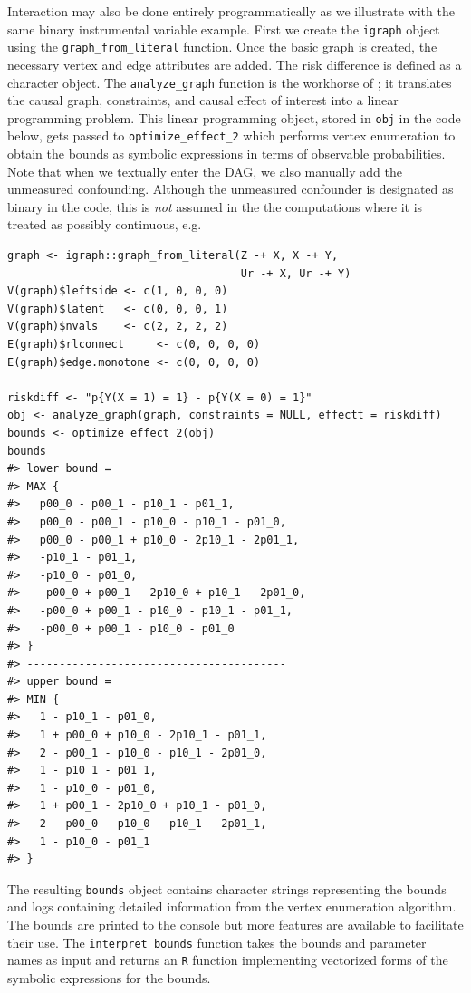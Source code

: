 Interaction may also be done entirely programmatically as we illustrate with the same binary instrumental variable example. First we create the \texttt{igraph} object using the \texttt{graph\_from\_literal} function. Once the basic graph is created, the necessary vertex and edge attributes are added. The risk difference is defined as a character object. The \texttt{analyze\_graph} function is the workhorse of ; it translates the causal graph, constraints, and causal effect of interest into a linear programming problem. This linear programming object, stored in \texttt{obj} in the code below, gets passed to \texttt{optimize\_effect\_2} which performs vertex enumeration to obtain the bounds as symbolic expressions in terms of observable probabilities. Note that when we textually enter the DAG, we also manually add the unmeasured confounding. Although the unmeasured confounder is designated as binary in the code, this is \emph{not} assumed in the the computations where it is treated as possibly continuous, e.g.

\begin{verbatim}
graph <- igraph::graph_from_literal(Z -+ X, X -+ Y, 
                                    Ur -+ X, Ur -+ Y)
V(graph)$leftside <- c(1, 0, 0, 0)
V(graph)$latent   <- c(0, 0, 0, 1)
V(graph)$nvals    <- c(2, 2, 2, 2)
E(graph)$rlconnect     <- c(0, 0, 0, 0)
E(graph)$edge.monotone <- c(0, 0, 0, 0)

riskdiff <- "p{Y(X = 1) = 1} - p{Y(X = 0) = 1}"
obj <- analyze_graph(graph, constraints = NULL, effectt = riskdiff)
bounds <- optimize_effect_2(obj)
bounds
#> lower bound =  
#> MAX {
#>   p00_0 - p00_1 - p10_1 - p01_1,
#>   p00_0 - p00_1 - p10_0 - p10_1 - p01_0,
#>   p00_0 - p00_1 + p10_0 - 2p10_1 - 2p01_1,
#>   -p10_1 - p01_1,
#>   -p10_0 - p01_0,
#>   -p00_0 + p00_1 - 2p10_0 + p10_1 - 2p01_0,
#>   -p00_0 + p00_1 - p10_0 - p10_1 - p01_1,
#>   -p00_0 + p00_1 - p10_0 - p01_0
#> }
#> ----------------------------------------
#> upper bound =  
#> MIN {
#>   1 - p10_1 - p01_0,
#>   1 + p00_0 + p10_0 - 2p10_1 - p01_1,
#>   2 - p00_1 - p10_0 - p10_1 - 2p01_0,
#>   1 - p10_1 - p01_1,
#>   1 - p10_0 - p01_0,
#>   1 + p00_1 - 2p10_0 + p10_1 - p01_0,
#>   2 - p00_0 - p10_0 - p10_1 - 2p01_1,
#>   1 - p10_0 - p01_1
#> }
\end{verbatim}

The resulting \texttt{bounds} object contains character strings representing the bounds and logs containing detailed information from the vertex enumeration algorithm. The bounds are printed to the console but more features are available to facilitate their use. The \texttt{interpret\_bounds} function takes the bounds and parameter names as input and returns an \texttt{R} function implementing vectorized forms of the symbolic expressions for the bounds.

